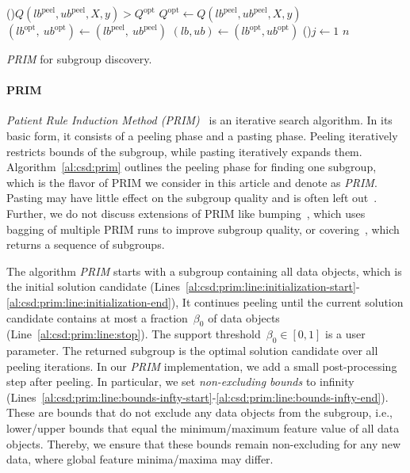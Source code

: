 \documentclass{article}
\theoremstyle{definition}
\begin{document}
\begin{algorithm}[p]
{		\If(){$Q(\mathit{lb}^{\text{peel}}, \mathit{ub}^{\text{peel}}, X, y) > Q^{\text{opt}}$}{ \label{al:csd:prim:line:opt-check-start}
			$Q^{\text{opt}} \leftarrow Q(\mathit{lb}^{\text{peel}}, \mathit{ub}^{\text{peel}}, X, y)$\;
			$(\mathit{lb}^{\text{opt}},~ \mathit{ub}^{\text{opt}}) \leftarrow (\mathit{lb}^{\text{peel}},~ \mathit{ub}^{\text{peel}})$\; \label{al:csd:prim:line:opt-check-end} \label{al:csd:prim:iteration-end}
		}
	}
	$(\mathit{lb}, \mathit{ub}) \leftarrow (\mathit{lb}^{\text{opt}}, \mathit{ub}^{\text{opt}})$\;
	\For(){$j \leftarrow 1$ \KwTo $n$}{ \label{al:csd:prim:line:bounds-infty-start}
		 \label{al:csd:prim:line:bounds-infty-end}
	}
	\caption{\emph{PRIM} for subgroup discovery.}
	\label{al:csd:prim}
\end{algorithm}

\paragraph{PRIM}

\emph{Patient Rule Induction Method (PRIM)}~\cite{friedman1999bump} is an iterative search algorithm.
In its basic form, it consists of a peeling phase and a pasting phase.
Peeling iteratively restricts bounds of the subgroup, while pasting iteratively expands them.
Algorithm~\ref{al:csd:prim} outlines the peeling phase for finding one subgroup, which is the flavor of PRIM we consider in this article and denote as \emph{PRIM}.
Pasting may have little effect on the subgroup quality and is often left out~\cite{arzamasov2021reds}.
Further, we do not discuss extensions of PRIM like bumping~\cite{friedman1999bump, kwakkel2016improving}, which uses bagging of multiple PRIM runs to improve subgroup quality, or covering~\cite{friedman1999bump}, which returns a sequence of subgroups.

The algorithm \emph{PRIM} starts with a subgroup containing all data objects, which is the initial solution candidate (Lines~\ref{al:csd:prim:line:initialization-start}-\ref{al:csd:prim:line:initialization-end}), 
It continues peeling until the current solution candidate contains at most a fraction~$\beta_0$ of data objects (Line~\ref{al:csd:prim:line:stop}).
The support threshold~$\beta_0 \in [0, 1]$ is a user parameter.
The returned subgroup is the optimal solution candidate over all peeling iterations.
In our \emph{PRIM} implementation, we add a small post-processing step after peeling.
In particular, we set \emph{non-excluding bounds} to infinity (Lines~\ref{al:csd:prim:line:bounds-infty-start}-\ref{al:csd:prim:line:bounds-infty-end}).
These are bounds that do not exclude any data objects from the subgroup, i.e., lower/upper bounds that equal the minimum/maximum feature value of all data objects.
Thereby, we ensure that these bounds remain non-excluding for any new data, where global feature minima/maxima may differ.
\end{document}
